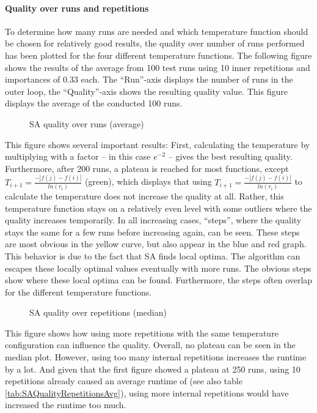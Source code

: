\paragraph{Quality over runs and repetitions}

To determine how many runs are needed and which temperature function should be chosen for relatively good results, the quality over number of runs performed has been plotted for the four different temperature functions.
The following figure shows the results of the average from 100 test runs using 10 inner repetitions and importances of 0.33 each.
The \enquote{Run}-axis displays the number of runs in the outer loop, the \enquote{Quality}-axis shows the resulting quality value.
This figure displays the average of the conducted 100 runs.

\begin{figure}[H]
	\centering
	
	\caption{SA quality over runs (average)}
	\label{fig:SAQualityRuns}
\end{figure}

This figure shows several important results:
First, calculating the temperature by multiplying with a factor -- in this case $e^{-2}$ -- gives the best resulting quality.
Furthermore, after 200 runs, a plateau is reached for most functions, except  $ T_{i+1} = \frac{- |f(j)-f(i)|}{ln(r_i)} $ (green), which displays that using $ T_{i+1} = \frac{- |f(j)-f(i)|}{ln(r_i)} $ to calculate the temperature does not increase the quality at all.
Rather, this temperature function stays on a relatively even level with some outliers where the quality increases temporarily.
In all increasing cases, \enquote{steps}, where the quality stays the same for a few runs before increasing again, can be seen.
These steps are most obvious in the yellow curve, but also appear in the blue and red graph.
This behavior is due to the fact that SA finds local optima.
The algorithm can escapes these locally optimal values eventually with more runs.
The obvious steps show where these local optima can be found.
Furthermore, the steps often overlap for the different temperature functions.

\begin{figure}[H]
	\centering
	
	\caption{SA quality over repetitions (median)}
	\label{fig:SAQualityRepititions}
\end{figure}

This figure shows how using more repetitions with the same temperature configuration can influence the quality.
Overall, no plateau can be seen in the median plot. 
However, using too many internal repetitions increases the runtime by a lot.
And given that the first figure showed a plateau at 250 runs, using 10 repetitions already caused an average runtime of (see also table \ref{tab:SAQualityRepetitionsAvg}), using more internal repetitions would have increased the runtime too much.

